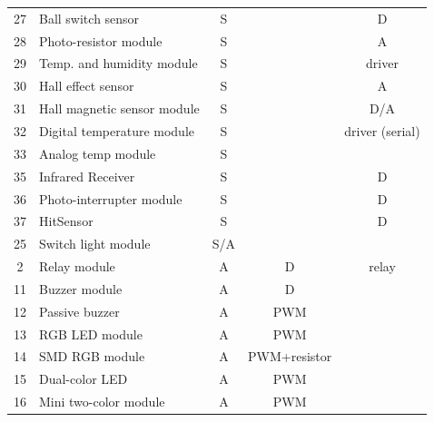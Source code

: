 \documentclass[10pt,a4paper,onecolumn]{article}
\begin{document}
\begin{table}[h!]
\begin{tabular}{clccc}
      \rowcolor{gray!20} 27  & Ball switch sensor            & S                 &                & D               \\
      28  & Photo-resistor module         & S                 &                & A               \\
      \rowcolor{gray!20} 29  & Temp. and humidity module      & S                 &                & driver          \\
      30  & Hall effect sensor            & S                 &                & A               \\
      \rowcolor{gray!20} 31  & Hall magnetic sensor module   & S                 &                & D/A             \\
      32  & Digital temperature module    & S                 &                & driver (serial) \\
      \rowcolor{gray!20} 33  & Analog temp module            & S                 &                &                 \\
      35  & Infrared Receiver             & S                 &                & D               \\
      \rowcolor{gray!20} 36  & Photo-interrupter module      & S                 &                & D               \\
      37  & HitSensor                     & S                 &                & D               \\
      \rowcolor{gray!20} 25  & Switch light module           & S/A               &                &                 \\
      2   & Relay module                  & A                 & D              & relay           \\
      \rowcolor{gray!20} 11  & Buzzer module                 & A                 & D              &                 \\
      12  & Passive buzzer                & A                 & PWM            &                 \\
      \rowcolor{gray!20} 13  & RGB LED module                & A                 & PWM            &                 \\
      14  & SMD RGB module                & A                 & PWM+resistor &                 \\
      \rowcolor{gray!20} 15  & Dual-color LED & A                 & PWM            &                 \\
      16  & Mini two-color module         & A                 & PWM            &                 \\

\end{tabular}
\end{table}
\end{document}
